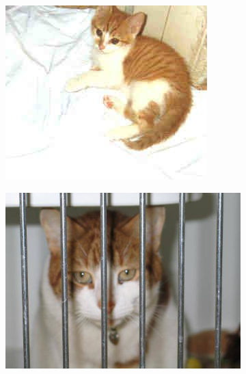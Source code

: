 \begin{figure}[h]
\begin{subfigure}[b]{.2\linewidth}
\includegraphics[width=\linewidth]{Figs/cat1412.jpg}
\end{subfigure}
\begin{subfigure}[b]{.2\linewidth}
\includegraphics[width=\linewidth]{Figs/cat1168.jpg}
\end{subfigure}


\end{figure}
